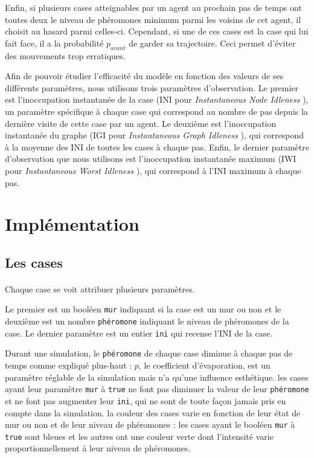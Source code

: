 \documentclass{article}
\begin{document}
    Enfin, si plusieurs cases atteignables par un agent au prochain pas de temps ont toutes deux le niveau de phéromones minimum 
    parmi les voisins de cet agent, il choisit au hasard parmi celles-ci. Cependant, si une de ces cases est la case qui lui fait 
    face, il a la probabilité $p_{avant}$ de garder sa trajectoire. Ceci permet d'éviter des mouvements trop erratiques.

    Afin de pouvoir étudier l'efficacité du modèle en fonction des valeurs de ses différents paramètres, nous utilisons trois paramètres
    d'observation. Le premier est l'inoccupation instantanée de la case (INI pour \textit{Instantaneous  Node  Idleness }), un paramètre 
    spécifique à chaque case qui correspond au nombre de pas depuis la dernière visite de cette case par un agent. Le deuxième est 
    l'inoccupation instantanée du graphe (IGI pour \textit{Instantaneous  Graph  Idleness }), qui correspond à la moyenne des INI de toutes les
    cases à chaque pas. Enfin, le dernier paramètre d'observation que nous utilisons est l'inoccupation instantanée maximum (IWI pour 
    \textit{Instantaneous   Worst   Idleness }), qui correspond à l'INI maximum à chaque pas.

\section{Implémentation}
    \subsection{Les cases}

        \paragraph{}Chaque case se voit attribuer plusieurs paramètres.

        Le premier est un booléen \texttt{mur} indiquant si la case est un mur ou non et le deuxième est un nombre \texttt{phéromone} indiquant le niveau de phéromones
        de la case. Le dernier paramètre est un entier \texttt{ini} qui recense l'INI de la case.

        Durant une simulation, le \texttt{phéromone} de chaque case diminue à chaque pas de temps comme expliqué plus-haut : $p$, le coefficient
        d'évaporation, est un paramètre réglable de la simulation mais n'a qu'une influence esthétique. les cases ayant leur paramètre \texttt{mur}
        à \texttt{true} ne font pas diminuer la valeur de leur \texttt{phéromone} et ne font pas augmenter leur \texttt{ini}, qui ne sont de toute façon jamais pris en compte dans la simulation.
        la couleur des cases varie en fonction de leur état de mur ou non et de leur niveau de phéromones : les cases
        ayant le booléen \texttt{mur} à \texttt{true} sont bleues et les autres ont une couleur verte dont l'intensité varie proportionnellement à leur
        niveau de phéromones.
\end{document}
